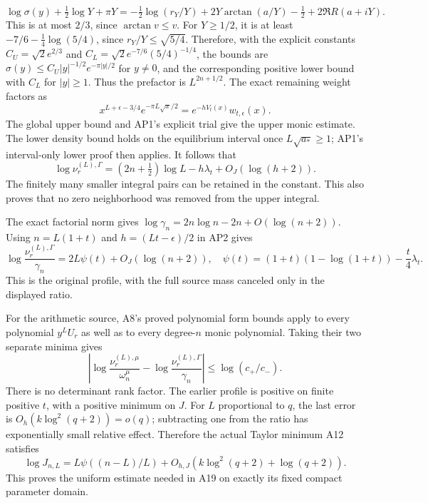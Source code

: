 \documentclass[11pt]{article}
\begin{document}
\[
\log\sigma(y)+\tfrac12\log Y+\pi Y
=-\tfrac12\log(r_Y/Y)+2Y\arctan(a/Y)-\tfrac12
 +2\Re R(a+iY).
\]
This is at most $2/3$, since $\arctan v\le v$.
For $Y\ge1/2$, it is at least
$-7/6-\tfrac14\log(5/4)$, since $r_Y/Y\le\sqrt{5/4}$.
Therefore, with the explicit constants
$C_U=\sqrt2e^{2/3}$ and
$C_L=\sqrt2e^{-7/6}(5/4)^{-1/4}$, the bounds are
\(\sigma(y)\le C_U|y|^{-1/2}e^{-\pi|y|/2}\) for \(y\ne0\),
and the corresponding positive lower bound with \(C_L\) for
\(|y|\ge1\). Thus the prefactor is \(L^{2n+1/2}\).
The exact remaining weight factors as
\[
x^{L+\epsilon-3/4}e^{-\pi L\sqrt x/2}
=e^{-hV_t(x)}w_{t,\epsilon}(x).
\]
The global upper bound and AP1's explicit trial give the upper
monic estimate. The lower density bound holds on the equilibrium
interval once \(L\sqrt{a_*}\ge1\); AP1's interval-only lower proof
then applies. It follows that
\begin{equation}\tag{AP2}
\log\nu_r^{(L),\Gamma}
=(2n+\tfrac12)\log L-h\lambda_t+O_J(\log(h+2)).
\end{equation}
The finitely many smaller integral pairs can be retained in the
constant. This also proves that no zero neighborhood was removed
from the upper integral.

The exact factorial norm gives
\(\log\gamma_n=2n\log n-2n+O(\log(n+2))\).
Using \(n=L(1+t)\) and \(h=(Lt-\epsilon)/2\) in AP2 gives
\begin{equation}\tag{AP3}
\log\frac{\nu_r^{(L),\Gamma}}{\gamma_n}
=2L\psi(t)+O_J(\log(n+2)),\quad
\psi(t)=(1+t)(1-\log(1+t))-\frac t4\lambda_t .
\end{equation}
This is the original profile, with the full source mass canceled
only in the displayed ratio.

For the arithmetic source, A8's proved polynomial form bounds
apply to every polynomial \(y^LU_r\) as well as to every degree-\(n\)
monic polynomial. Taking their two separate minima gives
\[
\left|\log\frac{\nu_r^{(L),\mu}}{\omega_n^\mu}
-\log\frac{\nu_r^{(L),\Gamma}}{\gamma_n}\right|
\le\log(c_+/c_-).
\]
There is no determinant rank factor. The earlier profile is
positive on finite positive \(t\), with a positive minimum on \(J\).
For \(L\) proportional to \(q\), the last error is
\(O_h(k\log^2(q+2))=o(q)\); subtracting one from the ratio has
exponentially small relative effect. Therefore the actual
Taylor minimum A12 satisfies
\begin{equation}\tag{AP4}
\log J_{n,L}=L\psi((n-L)/L)
+O_{h,J}(k\log^2(q+2)+\log(q+2)).
\end{equation}
This proves the uniform estimate needed in A19 on exactly its
fixed compact parameter domain.
\end{document}
